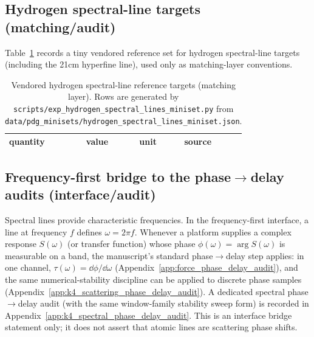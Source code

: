 \subsection{Hydrogen spectral-line targets (matching/audit)}
\label{subsec:hydrogen_spectral_lines_miniset}
\MatchTag Table~\ref{tab:hydrogen_spectral_lines_miniset} records a tiny vendored reference set for hydrogen spectral-line targets (including the 21cm hyperfine line), used only as matching-layer conventions.

\AuditTag %

\begin{table}[t]
\centering
\small
\setlength{\tabcolsep}{7pt}
\renewcommand{\arraystretch}{1.15}
\begin{tabular}{llll}
\toprule
quantity & value & unit & source \\
\midrule
%
\end{tabular}
\caption{Vendored hydrogen spectral-line reference targets (matching layer). Rows are generated by \texttt{scripts/exp\_hydrogen\_spectral\_lines\_miniset.py} from \texttt{data/pdg\_minisets/hydrogen\_spectral\_lines\_miniset.json}.}
\label{tab:hydrogen_spectral_lines_miniset}
\end{table}

\subsection{Frequency-first bridge to the phase$\to$delay audits (interface/audit)}
\label{subsec:hydrogen_phase_delay_bridge}
\InterfaceTag Spectral lines provide characteristic frequencies. In the frequency-first interface, a line at frequency $f$ defines $\omega=2\pi f$.
Whenever a platform supplies a complex response $S(\omega)$ (or transfer function) whose phase $\phi(\omega)=\arg S(\omega)$ is measurable on a band, the manuscript's standard phase$\to$delay step applies:
in one channel, $\tau(\omega)=\dd\phi/\dd\omega$ (Appendix~\ref{app:force_phase_delay_audit}), and the same numerical-stability discipline can be applied to discrete phase samples (Appendix~\ref{app:k4_scattering_phase_delay_audit}).
\AuditTag A dedicated spectral phase$\to$delay audit (with the same window-family stability sweep form) is recorded in Appendix~\ref{app:k4_spectral_phase_delay_audit}.
\AuditTag This is an interface bridge statement only; it does not assert that atomic lines are scattering phase shifts.

